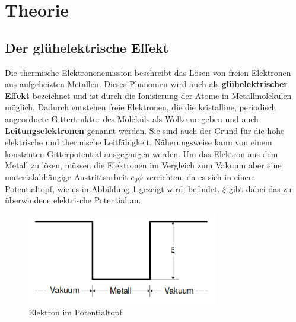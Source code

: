 \section{Theorie}
\subsection{Der glühelektrische Effekt}
Die thermische Elektronenemission beschreibt das Lösen von freien Elektronen aus aufgeheizten Metallen.
Dieses Phänomen wird auch als \textbf{glühelektrischer Effekt} bezeichnet und ist durch die Ionisierung der Atome in Metallmolekülen möglich.
Dadurch entstehen freie Elektronen, die die kristalline, periodisch angeordnete Gittertruktur des Moleküls als Wolke umgeben und auch \textbf{Leitungselektronen} genannt werden.
Sie sind auch der Grund für die hohe elektrische und thermische Leitfähigkeit.
Näherungsweise kann von einem konstanten Gitterpotential ausgegangen werden.
Um das Elektron aus dem Metall zu lösen, müssen die Elektronen im Vergleich zum Vakuum aber eine materialabhängige Austrittsarbeit $e_0 \phi$ verrichten, da es sich in einem Potentialtopf, wie es in Abbildung \ref{fig:pot} gezeigt wird, befindet.
$\xi$ gibt dabei das zu überwindene elektrische Potential an.
\begin{figure}[h]
    \centering
    \includegraphics[height=4cm]{Theorie/Potentialtopf.png}
    \caption{Elektron im Potentialtopf.}
    \label{fig:pot}
\end{figure}

